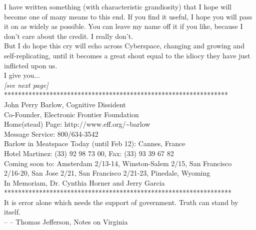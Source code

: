 \documentclass[11pt,twoside,a4paper]{book}
\begin{document}
\begin{minipage}[ht]{1.00\textwidth}
	I have written something (with characteristic grandiosity) that I hope will become one of many means to this end. If you find it useful, I hope you will pass it on as widely as possible. You can leave my name off it if you like, because I don't care about the credit. I really don't. ~\\
	
	But I do hope this cry will echo across Cyberspace, changing and growing and self-replicating, until it becomes a great shout equal to the idiocy they have just inflicted upon us. ~\\
	
	I give you... ~\\
	
	\emph{[see next page]} ~\\
	
	**************************************************************** ~\\
	John Perry Barlow, Cognitive Dissident ~\\
	Co-Founder, Electronic Frontier Foundation ~\\
	
	Home(stead) Page: http://www.eff.org/\textasciitilde barlow ~\\
	
	Message Service: 800/634-3542 ~\\
	
	Barlow in Meatspace Today (until Feb 12): Cannes, France ~\\
	Hotel Martinez: (33) 92 98 73 00, Fax: (33) 93 39 67 82 ~\\
	
	Coming soon to: Amsterdam 2/13-14, Winston-Salem 2/15, San Francisco ~\\
	2/16-20, San Jose 2/21, San Francisco 2/21-23, Pinedale, Wyoming ~\\
	
	In Memoriam, Dr. Cynthia Horner and Jerry Garcia ~\\
	
	***************************************************************** ~\\
	
	It is error alone which needs the support of government.  Truth can stand by itself. ~\\
							-- -- Thomas Jefferson, Notes on Virginia
\end{minipage} ~\\
                         
\end{document}
